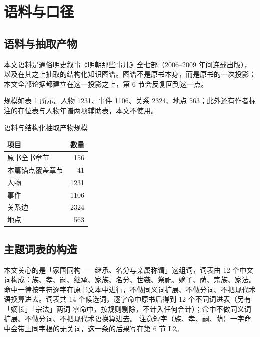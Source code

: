 \section{语料与口径}

\subsection{语料与抽取产物}

本文语料是通俗明史叙事《明朝那些事儿》全七部（2006--2009 年间连载出版）\citep{dangnian2009}，以及在其之上抽取的结构化知识图谱。图谱不是原书本身，而是原书的一次投影；本文全部论据都建立在这一投影之上，第 6 节会反复回到这一点。

规模如表 \ref{tab:corpus} 所示。人物 1231、事件 1106、关系 2324、地点 563；此外还有作者标注的在位表与人物年谱两项辅助表，本文不使用。

\begin{table}[!t]
\centering
\caption{语料与结构化抽取产物规模}
\label{tab:corpus}
\small
\begin{tabular}{lr}
\toprule
项目 & 数量 \\
\midrule
原书全书章节 & 156 \\
本篇锚点覆盖章节 & 41 \\
人物 & 1231 \\
事件 & 1106 \\
关系边 & 2324 \\
地点 & 563 \\
\bottomrule
\end{tabular}
\end{table}



\subsection{主题词表的构造}

本文关心的是「家国同构——继承、名分与亲属称谓」这组词，词表由 12 个中文词构成：族、孝、嗣、继承、家族、名分、世袭、祭祀、嫡子、荫、宗族、家法。命中一律按字符逐字在原书文本中进行，不做同义词扩展、不做分词、不把现代术语换算进去。词表共 14 个候选词，逐字命中原书后得到 12 个不同词进表（另有「嫡长」「宗法」两词
零命中，按规则剔除，不计入任何合计）；命中不做同义词扩展、不做分词、不把现代术语换算进去。
注意短字（族、孝、嗣、荫）一字命中会带上同字根的无关词，这一条的后果写在第 6 节 L2。

